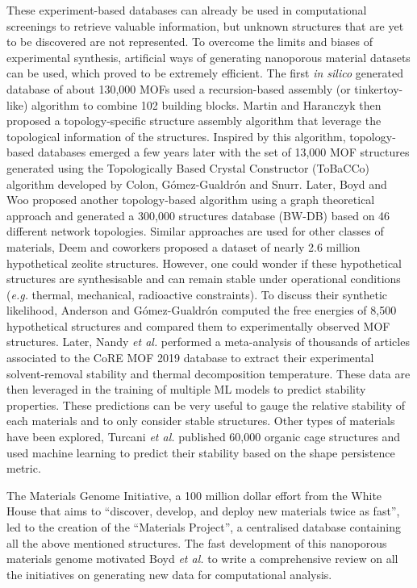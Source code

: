 \documentclass[main.tex]{subfiles}
\begin{document}
These experiment-based databases can already be used in computational screenings to retrieve valuable information, but unknown structures that are yet to be discovered are not represented. To overcome the limits and biases of experimental synthesis, artificial ways of generating nanoporous material datasets can be used, which proved to be extremely efficient. The first \emph{in silico} generated database of about 130,000 MOFs used a recursion-based assembly (or tinkertoy-like) algorithm to combine 102 building blocks.\cite{Wilmer_2012} Martin and Haranczyk then proposed a topology-specific structure assembly algorithm that leverage the topological information of the structures.\cite{Martin_2014} Inspired by this algorithm, topology-based databases emerged a few years later with the set of 13,000 MOF structures generated using the Topologically Based Crystal Constructor (ToBaCCo) algorithm developed by Colon, G{\'{o}}mez-Gualdr{\'{o}}n and Snurr.\cite{Colon_2017}
Later, Boyd and Woo proposed another topology-based algorithm using a graph theoretical approach and generated a 300,000 structures database (BW-DB) based on 46 different network topologies.\cite{Boyd_2016}
Similar approaches are used for other classes of materials, Deem and coworkers proposed a dataset of nearly 2.6 million hypothetical zeolite structures.\cite{Earl_2006,Deem_2009,Pophale_2011}
However, one could wonder if these hypothetical structures are synthesisable and can remain stable under operational conditions (\emph{e.g.} thermal, mechanical, radioactive constraints). To discuss their synthetic likelihood, Anderson and G{\'{o}}mez-Gualdr{\'{o}}n computed the free energies of 8,500 hypothetical structures and compared them to experimentally observed MOF structures.\cite{Anderson_2020}
Later, Nandy \emph{et al.} performed a meta-analysis of thousands of articles associated to the CoRE MOF 2019 database to extract their experimental solvent-removal stability and thermal decomposition temperature.\cite{Nandy_2021} These data are then leveraged in the training of multiple ML models to predict stability properties. These predictions can be very useful to gauge the relative stability of each materials and to only consider stable structures. Other types of materials have been explored, Turcani \emph{et al.} published 60,000 organic cage structures and used machine learning to predict their stability based on the shape persistence metric.\cite{Turcani_2018}

The Materials Genome Initiative, a 100 million dollar effort from the White House that aims to ``discover, develop, and deploy new materials twice as fast'', led to the creation of the ``Materials Project'', a centralised database containing all the above mentioned structures.\cite{kalil2011national,Matgenome,Jain_2013}
The fast development of this nanoporous materials genome motivated Boyd \emph{et al.} to write a comprehensive review on all the initiatives on generating new data for computational analysis.\cite{Boyd_2017}
\end{document}
